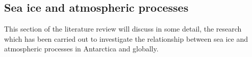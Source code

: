 \subsection{Sea ice and atmospheric processes}
This section of the literature review will discuss in some detail, the research which has been carried out to investigate the relationship between sea ice and atmospheric processes in Antarctica and globally.